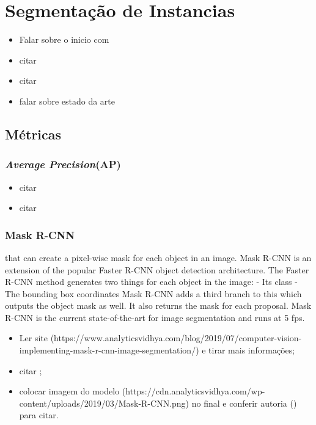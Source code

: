 \newpage
\clearpage
\section{Segmentação de Instancias}
\label{instance:instance}
\begin{itemize}
    \item Falar sobre o inicio com \cite{Vaillant1994}
    \item citar \cite{Minaee2021}
    \item citar \cite{Bolya2019}
    \item falar sobre estado da arte \cite{Hafiz2020}
\end{itemize}

\subsection{Métricas}
\subsubsection{\textit{Average Precision}(AP)}
\label{instance:AP}
\begin{itemize}
    \item citar \cite{Hariharan2014}
    \item citar \cite{Lin2014}
\end{itemize}

\subsubsection{Mask R-CNN}
that can create a pixel-wise mask for each object in an image.
Mask R-CNN is an extension of the popular Faster R-CNN object detection architecture.
The Faster R-CNN method generates two things for each object in the image:
 - Its class
 - The bounding box coordinates
Mask R-CNN adds a third branch to this which outputs the object mask as well.
It also returns the mask for each proposal.
Mask R-CNN is the current state-of-the-art for image segmentation and runs at 5 fps.

\begin{itemize}
    \item Ler site (https://www.analyticsvidhya.com/blog/2019/07/computer-vision-implementing-mask-r-cnn-image-segmentation/) e tirar mais informações;
    \item citar \cite{He2020};
    \item colocar imagem do modelo (https://cdn.analyticsvidhya.com/wp-content/uploads/2019/03/Mask-R-CNN.png) no final e conferir autoria (\cite{He2020}) para citar.
\end{itemize}

